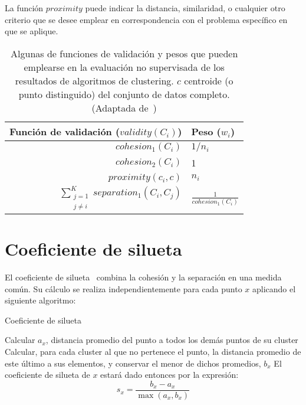 La función $proximity$ puede indicar la distancia, similaridad, o cualquier otro criterio que se desee emplear en correspondencia con el problema específico en que se aplique.

\begin{table}[H]
    \centering
    \begin{tabular}{rl}
        \hline
        Función de validación ($validity(C_i)$)                        & Peso ($w_i$)                            \\                 \hline
        $cohesion_1(C_i)$                                              & $1/n_i$                                 \\
        $cohesion_2(C_i)$                                              & 1                                       \\
        $proximity(c_i , c)$                                           & $n_i$                                   \\
        $\sum_{\substack{j=1 \\ j\neq i}}^{K}{separation_1(C_i, C_j)}$ & $\frac{1}{cohesion_1(C_i)}$
    \end{tabular}
    \caption{Algunas de funciones de validación y pesos que pueden emplearse en la evaluación no supervisada de los resultados de algoritmos de clustering. $c$ centroide (o punto distinguido) del conjunto de datos completo.
    (Adaptada de~\cite{Tan05})}
    \label{table:validity-weights}
\end{table}

\section{Coeficiente de silueta}\label{sec:coeficienteDeSilueta}

El coeficiente de silueta~\cite{Rousseeuw87, Tan05} combina la cohesión y la separación en una medida común.
Su cálculo se realiza independientemente para cada punto $x$ aplicando el siguiente algoritmo:

\begin{algorithm}
    \caption{Coeficiente de silueta}
    \label{algorithm:silohuette-coefficient}
    Calcular $a_x$, distancia promedio del punto a todos los demás puntos de su cluster\;
    Calcular, para cada cluster al que no pertenece el punto, la distancia promedio de este último a sus elementos, y conservar el menor de dichos promedios, $b_x$\;
    El coeficiente de silueta de $x$ estará dado entonces por la expresión:
    \begin{equation*}
        s_x = \frac{b_x - a_x}{\max{(a_x, b_x)}}
    \end{equation*}
\end{algorithm}

